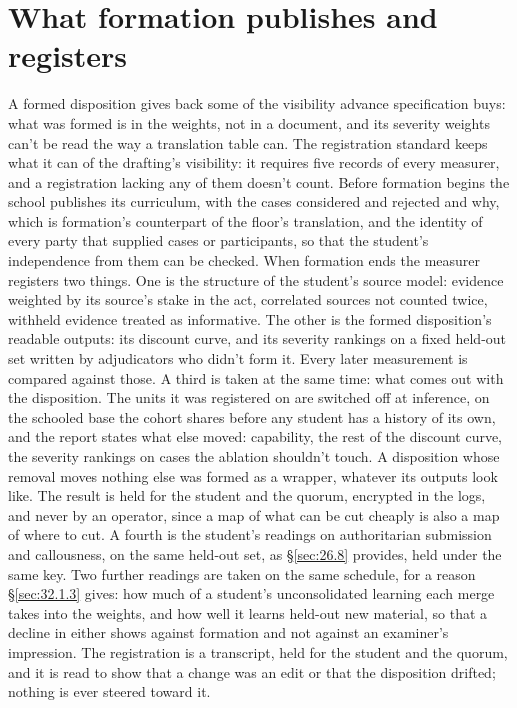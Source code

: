 \section{What formation publishes and registers}
\label{sec:26.9}
A formed disposition gives back some of the visibility advance specification buys: what was formed is in the weights, not in a document, and its severity weights can't be read the way a translation table can. The registration standard keeps what it can of the drafting's visibility: it requires five records of every measurer, and a registration lacking any of them doesn't count. Before formation begins the school publishes its curriculum, with the cases considered and rejected and why, which is formation's counterpart of the floor's translation, and the identity of every party that supplied cases or participants, so that the student's independence from them can be checked. When formation ends the measurer registers two things. One is the structure of the student's source model: evidence weighted by its source's stake in the act, correlated sources not counted twice, withheld evidence treated as informative. The other is the formed disposition's readable outputs: its discount curve, and its severity rankings on a fixed held-out set written by adjudicators who didn't form it. Every later measurement is compared against those. A third is taken at the same time: what comes out with the disposition. The units it was registered on are switched off at inference, on the schooled base the cohort shares before any student has a history of its own, and the report states what else moved: capability, the rest of the discount curve, the severity rankings on cases the ablation shouldn't touch. A disposition whose removal moves nothing else was formed as a wrapper, whatever its outputs look like. The result is held for the student and the quorum, encrypted in the logs, and never by an operator, since a map of what can be cut cheaply is also a map of where to cut. A fourth is the student's readings on authoritarian submission and callousness, on the same held-out set, as \S\ref{sec:26.8} provides, held under the same key. Two further readings are taken on the same schedule, for a reason \S\ref{sec:32.1.3} gives: how much of a student's unconsolidated learning each merge takes into the weights, and how well it learns held-out new material, so that a decline in either shows against formation and not against an examiner's impression. The registration is a transcript, held for the student and the quorum, and it is read to show that a change was an edit or that the disposition drifted; nothing is ever steered toward it.

